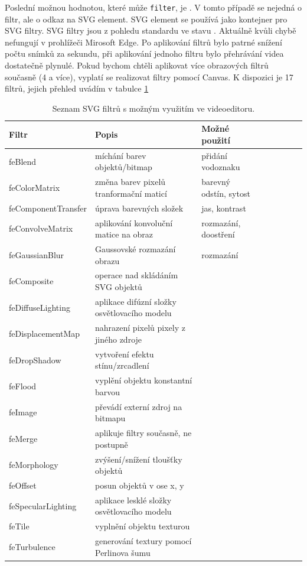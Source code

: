 Poslední možnou hodnotou, které může \texttt{filter}, je . V tomto případě se nejedná o filtr, ale o odkaz na SVG element. SVG element se používá jako kontejner pro SVG filtry. SVG filtry jsou z pohledu standardu ve stavu . Aktuálně kvůli chybě nefungují v prohlížeči Mirosoft Edge. Po aplikování filtrů bylo patrné snížení počtu snímků za sekundu, při aplikování jednoho filtru bylo přehrávání videa dostatečně plynulé. Pokud bychom chtěli aplikovat více obrazových filtrů současně (4 a více), vyplatí se realizovat filtry pomocí Canvas. K dispozici je 17 filtrů, jejich přehled uvádím v tabulce \ref{tab:svg}

\begin{table}[h]
    \centering
    \begin{tabular}{|l|l|l|l|l|l|l|l|}
    \hline
    Filtr   & Popis & Možné použití \\
    \hline
    feBlend & míchání barev objektů/bitmap & přidání vodoznaku \\
    feColorMatrix & změna barev pixelů tranformační maticí & barevný odstín, sytost \\
    feComponentTransfer & úprava barevných složek & jas, kontrast \\
    feConvolveMatrix & aplikování konvoluční matice na obraz & rozmazání, doostření \\
    feGaussianBlur & Gaussovské rozmazání obrazu & rozmazání \\
    feComposite & operace nad skládáním SVG objektů & \\
    feDiffuseLighting & aplikace difúzní složky osvětlovacího modelu & \\
    feDisplacementMap & nahrazení pixelů pixely z jiného zdroje & \\
    feDropShadow & vytvoření efektu stínu/zrcadlení & \\
    feFlood & vyplění objektu konstantní barvou & \\
    feImage & převádí externí zdroj na bitmapu & \\
    feMerge & aplikuje filtry současně, ne postupně & \\
    feMorphology & zvýšení/snížení tloušťky objektů & \\
    feOffset & posun objektů v ose x, y & \\
    feSpecularLighting & aplikace lesklé složky osvětlovacího modelu & \\
    feTile & vyplnění objektu texturou & \\
    feTurbulence & generování textury pomocí Perlinova šumu & \\

    \hline
    \end{tabular}
    \caption{Seznam SVG filtrů s možným využitím ve videoeditoru.}
    \label{tab:svg}
\end{table}
